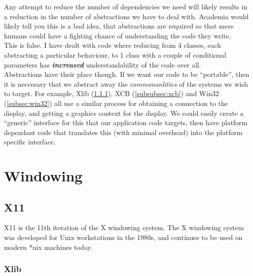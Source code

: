 \documentclass{article}
\newcommand{\textem}[1]{\textit{\textbf{#1}}}
\begin{document}
Any attempt to reduce the number of dependencies we need will likely results in
a reduction in the number of abstractions we have to deal with.
Academia would likely tell you this is a bad idea,
that abstractions are required so that mere humans could have a fighting chance
of understanding the code they write.
\\
This is false.
I have dealt with code where reducing from 4 classes,
each abstracting a particular behaviour,
to 1 class with a couple of conditional parameters has \textem{increased}
understandability of the code over all.
\\
Abstractions have their place though.
If we want our code to be ``portable'',
then it is neccesary that we abstract away the \textit{commonanlities} of the
systems we wish to target.
For example, Xlib (\ref{subsubsec:xlib}), XCB (\ref{subsubsec:xcb}) and Win32
(\ref{subsec:win32}) all use a similar process for obtaining a connection to
the display, and getting a graphics context for the display.
We could easily create a ``generic'' interface for this that our application
code targets, then have platform dependant code that translates this (with
minimal overhead) into the platform specific interface.


\pagebreak
\section{Windowing}
\label{sec:windowing}


\subsection{X11}
\label{subsec:x11}

X11 is the 11th iteration of the X windowing system.
The X windowing system was developed for Unix workstations in the 1980s,
and continues to be used on modern *nix machines today.

\subsubsection{Xlib}
\label{subsubsec:xlib}
\end{document}
